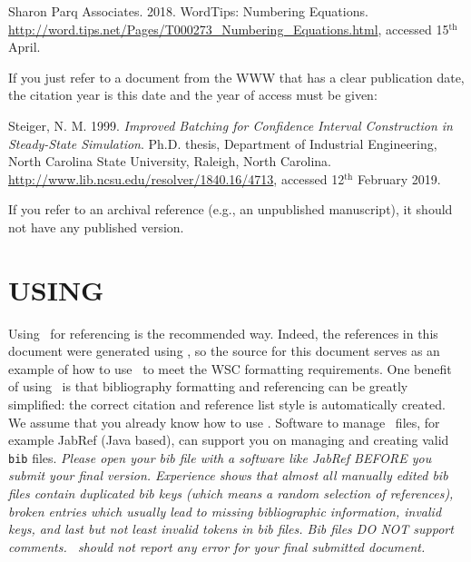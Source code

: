 \documentclass{article}
\begin{document}
{\sloppy
{\footnotesize
\begin{hangref}
\item Sharon Parq Associates. 2018. WordTips: Numbering Equations. \href{http://word.tips.net/Pages/T000273_Numbering_Equations.html}{http://word.tips.net/Pages/T000273\_Numbering\_Equations.html}, accessed 15$^{\textrm{th}}$ April.
\end{hangref}
}
}

If you just refer to a document from the WWW that has a clear publication date, the citation year is this date and the year of access must be given: 

{\sloppy
{\footnotesize
\begin{hangref}
\item Steiger, N. M. 1999. \textit{Improved Batching for Confidence Interval Construction in Steady-State Simulation}. Ph.D. thesis, Department of Industrial Engineering, North Carolina State University, Raleigh, North Carolina. \href{http://www.lib.ncsu.edu/resolver/1840.16/4713}{http://www.lib.ncsu.edu/resolver/1840.16/4713}, accessed 12$^{\textrm{th}}$ February 2019.
\end{hangref}
}
}

If you refer to an archival reference (e.g., an unpublished manuscript), it should not have any published version.

\section{USING \texorpdfstring{\BibTeX}{BibTex}}
\label{sec:bibtex}
Using \BibTeX\ for referencing is the recommended way. Indeed, the references in this document were generated using \BibTeX, so the source for this
document serves as an example of how to use \BibTeX\ to meet the WSC formatting requirements.
One benefit of using \BibTeX\ is that bibliography formatting and referencing can be greatly simplified: the correct citation and reference list style is automatically created.
We assume that you already know how to use \BibTeX.
Software to manage \BibTeX\ files, for example JabRef (Java based), can support you on managing and creating valid {\tt bib} files.
{\em Please open your bib file with a software like JabRef BEFORE you submit your final version. Experience shows that almost all manually edited bib files contain duplicated bib keys (which means a random selection of references), broken entries which usually lead to missing bibliographic information, invalid keys, and last but not least invalid tokens in bib files. Bib files DO NOT support comments. \BibTeX\ should not report any error for your final submitted document.}
\end{document}
